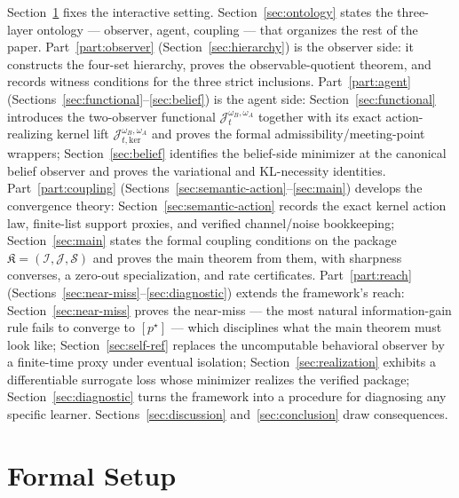 \documentclass[11pt]{article}
\theoremstyle{definition}
\theoremstyle{remark}
\theoremstyle{plain}
\theoremstyle{definition}
\newcommand{\Scal}{\mathcal{S}}
\begin{document}
Section~\ref{sec:setup} fixes the interactive setting. Section~\ref{sec:ontology} states the three-layer ontology --- observer, agent, coupling --- that organizes the rest of the paper. Part~\ref{part:observer} (Section~\ref{sec:hierarchy}) is the observer side: it constructs the four-set hierarchy, proves the observable-quotient theorem, and records witness conditions for the three strict inclusions. Part~\ref{part:agent} (Sections~\ref{sec:functional}--\ref{sec:belief}) is the agent side: Section~\ref{sec:functional} introduces the two-observer functional $\mathcal J_t^{\omega_B,\omega_A}$ together with its exact action-realizing kernel lift $\mathcal J_{t,\mathrm{ker}}^{\omega_B,\omega_A}$ and proves the formal admissibility/meeting-point wrappers; Section~\ref{sec:belief} identifies the belief-side minimizer at the canonical belief observer and proves the variational and KL-necessity identities. Part~\ref{part:coupling} (Sections~\ref{sec:semantic-action}--\ref{sec:main}) develops the convergence theory: Section~\ref{sec:semantic-action} records the exact kernel action law, finite-list support proxies, and verified channel/noise bookkeeping; Section~\ref{sec:main} states the formal coupling conditions on the package $\mathfrak K=(\mathcal I,\mathcal J,\Scal)$ and proves the main theorem from them, with sharpness converses, a zero-out specialization, and rate certificates. Part~\ref{part:reach} (Sections~\ref{sec:near-miss}--\ref{sec:diagnostic}) extends the framework's reach: Section~\ref{sec:near-miss} proves the near-miss --- the most natural information-gain rule fails to converge to $[p^\star]$ --- which disciplines what the main theorem must look like; Section~\ref{sec:self-ref} replaces the uncomputable behavioral observer by a finite-time proxy under eventual isolation; Section~\ref{sec:realization} exhibits a differentiable surrogate loss whose minimizer realizes the verified package; Section~\ref{sec:diagnostic} turns the framework into a procedure for diagnosing any specific learner. Sections~\ref{sec:discussion} and~\ref{sec:conclusion} draw consequences.

\section{Formal Setup}
\label{sec:setup}
\end{document}
